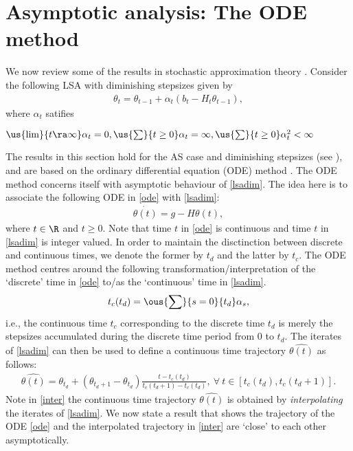 \section{Asymptotic analysis: The ODE method}
We now review some of the results in stochastic approximation theory \cite{SA}. Consider the following LSA with diminishing stepsizes given by
\begin{align}\label{lsadim}
\theta_t=\theta_{t-1}+\alpha_t(b_t-H_t\theta_{t-1}),
\end{align}
where $\alpha_t$ satifies 
\begin{assumption}\label{dimassmp}
$\us{\lim}{t\ra\infty }\alpha_t=0, \us{\sum}{t\geq 0}\alpha_t=\infty, \us{\sum}{t\geq 0}\alpha_t^2<\infty$
\end{assumption}
The results in this section hold for the AS case and diminishing stepsizes (see \Cref{} ), and are based on the ordinary differential equation (ODE) method \cite{SA,Kush}. The ODE method concerns itself with asymptotic behaviour of \eqref{lsadim}.
The idea here is to associate the following ODE in \eqref{ode} with \eqref{lsadim}:
\begin{align}\label{ode}
\dot{\theta(t)}=g-H\theta(t),
\end{align}
where $t\in\R$ and $t\geq 0$. Note that time $t$ in \eqref{ode} is continuous and time $t$ in \eqref{lsadim} is integer valued. In order to maintain the disctinction between discrete and continuous times, we denote the former by $t_d$ and the latter by $t_c$.
The ODE method centres around the following transformation/interpretation of the `discrete' time in \eqref{ode} to/as the `continuous' time in \eqref{lsadim}.
\begin{align}\label{stepacc}
t_c(t_d)=\ous{\sum}{s=0}{t_d}\alpha_s,
\end{align}
i.e., the continuous time $t_c$ corresponding to the discrete time $t_d$ is merely the stepsizes accumulated during the discrete time period from $0$ to $t_d$. The iterates of \eqref{lsadim} can then be used to define a continuous time trajectory $\hat{\theta(t)}$ as follows:
\begin{align}\label{inter}
\hat{\theta(t)}=\theta_{t_d}+(\theta_{t_d+1}-\theta_{t_d})\frac{t-t_c(t_d) }{t_c(t_d+1)-t_c(t_d)}, ~\forall~t\in[t_c(t_d),t_c(t_d+1)].
\end{align}
Note in \eqref{inter} the continuous time trajectory $\hat{\theta(t)}$ is obtained by \emph{interpolating} the iterates of \eqref{lsadim}.
We now state a result that shows the trajectory of the ODE \eqref{ode} and the interpolated trajectory in \eqref{inter} are `close' to each other asymptotically.
